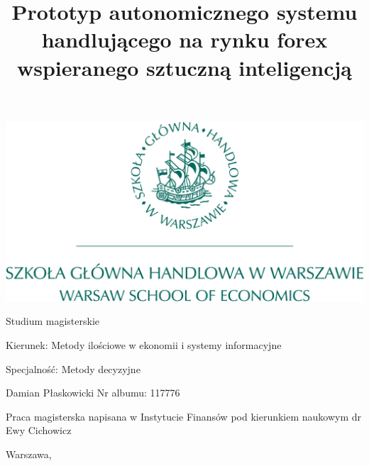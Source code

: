 \begin{center}
\includegraphics[scale=0.3]{sgh_full.png}

\vspace{1cm}

Studium magisterskie
\end{center}

\vspace{1cm}

\noindent Kierunek: Metody ilościowe w ekonomii i systemy informacyjne

\noindent Specjalność: Metody decyzyjne

\vspace{1cm}

{
\leftskip=10cm\noindent
Damian Płaskowicki\newline
Nr albumu: 117776

}

\vspace{2cm}

\title{Prototyp autonomicznego systemu handlującego na rynku forex wspieranego sztuczną inteligencją}
\makeatletter

\begin{center}
\LARGE\bf
\parbox{\textwidth}{\centering \@title}
\end{center}

\vspace{2cm}

{
\leftskip=10cm\noindent
Praca magisterska\newline 
napisana w Instytucie Finansów\newline
pod kierunkiem naukowym\newline
dr Ewy Cichowicz

}

\vfill

\begin{center}
Warszawa, \the\year
\end{center}
